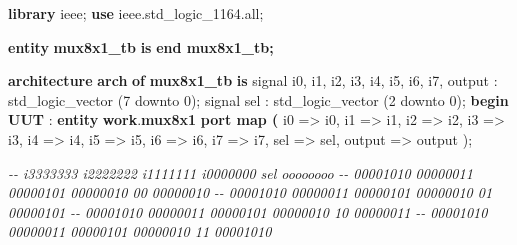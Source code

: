 \documentclass[11pt]{article}
\newenvironment{Shaded}{}{}
\newcommand{\KeywordTok}[1]{\textcolor[rgb]{0.00,0.44,0.13}{\textbf{{#1}}}}
\newcommand{\DataTypeTok}[1]{\textcolor[rgb]{0.56,0.13,0.00}{{#1}}}
\newcommand{\DecValTok}[1]{\textcolor[rgb]{0.25,0.63,0.44}{{#1}}}
\newcommand{\CommentTok}[1]{\textcolor[rgb]{0.38,0.63,0.69}{\textit{{#1}}}}
\newcommand{\OtherTok}[1]{\textcolor[rgb]{0.00,0.44,0.13}{{#1}}}
\newcommand{\ErrorTok}[1]{\textcolor[rgb]{1.00,0.00,0.00}{\textbf{{#1}}}}
\newcommand{\NormalTok}[1]{{#1}}
\begin{document}
\begin{Shaded}
\begin{Highlighting}[]
\KeywordTok{library}\NormalTok{ ieee;}
\KeywordTok{use}\NormalTok{ ieee}\OtherTok{.}\NormalTok{std\_logic\_1164}\OtherTok{.}\NormalTok{all;}

\KeywordTok{entity} \KeywordTok{mux8x1\_tb} \KeywordTok{is}
\KeywordTok{end mux8x1\_tb;}

\KeywordTok{architecture} \KeywordTok{arch} \KeywordTok{of} \KeywordTok{mux8x1\_tb} \KeywordTok{is}
    \OtherTok{signal}\NormalTok{ i0}\OtherTok{,}\NormalTok{ i1}\OtherTok{,}\NormalTok{ i2}\OtherTok{,}\NormalTok{ i3}\OtherTok{,}\NormalTok{ i4}\OtherTok{,}\NormalTok{ i5}\OtherTok{,}\NormalTok{ i6}\OtherTok{,}\NormalTok{ i7}\OtherTok{,}\NormalTok{ output }\OtherTok{:} \DataTypeTok{std\_logic\_vector}\NormalTok{ (}\DecValTok{7} \OtherTok{downto} \DecValTok{0}\NormalTok{);}
    \OtherTok{signal}\NormalTok{ sel }\OtherTok{:} \DataTypeTok{std\_logic\_vector}\NormalTok{ (}\DecValTok{2} \OtherTok{downto} \DecValTok{0}\NormalTok{);}
\KeywordTok{begin}
    \KeywordTok{UUT} \OtherTok{:} \ErrorTok{entity} \ErrorTok{work}\OtherTok{.}\ErrorTok{mux8x1} \KeywordTok{port map (}
\NormalTok{        i0 }\OtherTok{=\textgreater{}}\NormalTok{ i0}\OtherTok{,}
\NormalTok{        i1 }\OtherTok{=\textgreater{}}\NormalTok{ i1}\OtherTok{,}
\NormalTok{        i2 }\OtherTok{=\textgreater{}}\NormalTok{ i2}\OtherTok{,}
\NormalTok{        i3 }\OtherTok{=\textgreater{}}\NormalTok{ i3}\OtherTok{,}
\NormalTok{        i4 }\OtherTok{=\textgreater{}}\NormalTok{ i4}\OtherTok{,}
\NormalTok{        i5 }\OtherTok{=\textgreater{}}\NormalTok{ i5}\OtherTok{,}
\NormalTok{        i6 }\OtherTok{=\textgreater{}}\NormalTok{ i6}\OtherTok{,}
\NormalTok{        i7 }\OtherTok{=\textgreater{}}\NormalTok{ i7}\OtherTok{,}
\NormalTok{        sel }\OtherTok{=\textgreater{}}\NormalTok{ sel}\OtherTok{,}
\NormalTok{        output }\OtherTok{=\textgreater{}}\NormalTok{ output}
\NormalTok{    );}


    \CommentTok{{-}{-} i3333333 i2222222 i1111111 i0000000 sel   oooooooo}
    \CommentTok{{-}{-} 00001010 00000011 00000101 00000010 00    00000010}
    \CommentTok{{-}{-} 00001010 00000011 00000101 00000010 01    00000101}
    \CommentTok{{-}{-} 00001010 00000011 00000101 00000010 10    00000011}
    \CommentTok{{-}{-} 00001010 00000011 00000101 00000010 11    00001010}


\end{Highlighting}
\end{Shaded}
\end{document}

